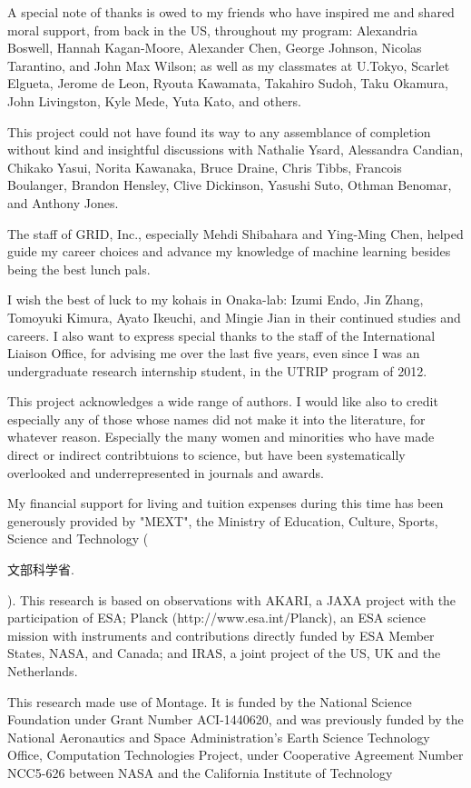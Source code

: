      A special note of thanks is owed to my friends who have inspired me and shared moral support, from back in the US, throughout my program: Alexandria Boswell, Hannah Kagan-Moore, Alexander Chen, George Johnson, Nicolas Tarantino, and John Max Wilson; as well as my classmates at U.Tokyo, Scarlet Elgueta, Jerome de Leon, Ryouta Kawamata, Takahiro Sudoh, Taku Okamura, John Livingston, Kyle Mede, Yuta Kato, and others.

     This project could not have found its way to any assemblance of completion without kind and insightful discussions with Nathalie Ysard, Alessandra Candian,  Chikako Yasui, Norita Kawanaka, Bruce Draine, Chris Tibbs, Francois Boulanger, Brandon Hensley, Clive Dickinson, Yasushi Suto, Othman Benomar, and Anthony Jones.

     The staff of GRID, Inc., especially Mehdi Shibahara and Ying-Ming Chen, helped guide my career choices and advance my knowledge of machine learning besides being the best lunch pals.

     I wish the best of luck to my kohais in Onaka-lab: Izumi Endo, Jin Zhang, Tomoyuki Kimura, Ayato Ikeuchi, and Mingie Jian in their continued studies and careers. I also want to express special thanks to the staff of the International Liaison Office, for advising me over the last five years, even since I was an undergraduate research internship student, in the UTRIP program of 2012.

     This project acknowledges a wide range of authors. I would like also to credit especially any of those whose names did not make it into the literature, for whatever reason. Especially the many women and minorities who have made direct or indirect contribtuions to science, but have been systematically overlooked and underrepresented in journals and awards.

     My financial support for living and tuition expenses during this time has been generously provided by "MEXT", the Ministry of Education, Culture, Sports, Science and Technology (\begin{CJK}{UTF8}{min}文部科学省.\end{CJK}). This research is based on observations with AKARI, a JAXA project with the participation of ESA; Planck (http://www.esa.int/Planck), an ESA science mission with instruments and contributions directly funded by ESA Member States, NASA, and Canada; and IRAS, a joint project of the US, UK and the Netherlands.

    This research made use of Montage. It is funded by the National Science Foundation under Grant Number ACI-1440620, and was previously funded by the National Aeronautics and Space Administration's Earth Science Technology Office, Computation Technologies Project, under Cooperative Agreement Number NCC5-626 between NASA and the California Institute of Technology
